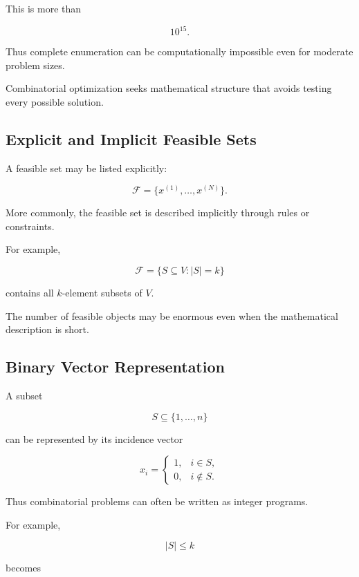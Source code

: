 This is more than

\[
10^{15}.
\]

Thus complete enumeration can be computationally impossible even for
moderate problem sizes.

Combinatorial optimization seeks mathematical structure that avoids
testing every possible solution.

\subsection{Explicit and Implicit Feasible Sets}
\label{subsec:explicit-implicit-feasible-sets}

A feasible set may be listed explicitly:

\[
\mathcal{F}
=
\{
x^{(1)},\ldots,x^{(N)}
\}.
\]

More commonly, the feasible set is described implicitly through rules or
constraints.

For example,

\[
\boxed{
\mathcal{F}
=
\{
S\subseteq V:
|S|=k
\}
}
\]

contains all \(k\)-element subsets of \(V\).

The number of feasible objects may be enormous even when the mathematical
description is short.

\subsection{Binary Vector Representation}
\label{subsec:binary-vector-combinatorial}

A subset

\[
S\subseteq\{1,\ldots,n\}
\]

can be represented by its incidence vector

\[
\boxed{
x_i
=
\begin{cases}
1,
&
i\in S,
\\
0,
&
i\notin S.
\end{cases}
}
\]

Thus combinatorial problems can often be written as integer programs.

For example,

\[
|S|\leq k
\]

becomes

